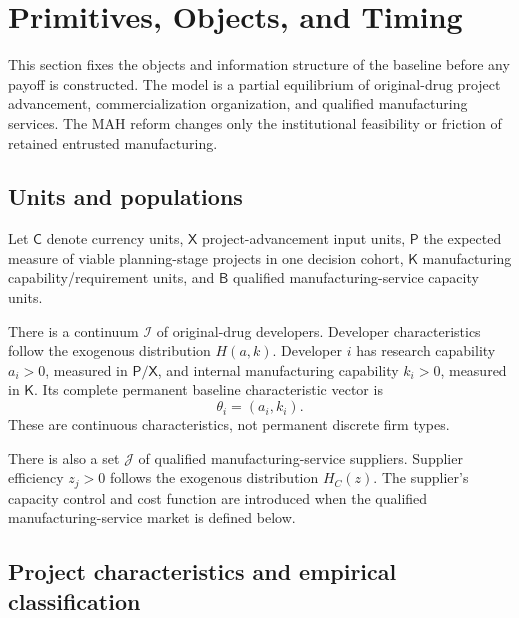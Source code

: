 \section{Primitives, Objects, and Timing}
\label{sec:p01-primitives-timing}

This section fixes the objects and information structure of the baseline before
any payoff is constructed.  The model is a partial equilibrium of
original-drug project advancement, commercialization organization, and
qualified manufacturing services.  The MAH reform changes only the
institutional feasibility or friction of retained entrusted manufacturing.

\subsection{Units and populations}
\label{subsec:p01-units-populations}

Let \(\mathsf C\) denote currency units, \(\mathsf X\) project-advancement
input units, \(\mathsf P\) the expected measure of viable planning-stage
projects in one decision cohort, \(\mathsf K\) manufacturing
capability/requirement units, and \(\mathsf B\) qualified manufacturing-service
capacity units.

There is a continuum \(\mathcal I\) of original-drug developers.  Developer
characteristics follow the exogenous distribution \(H(a,k)\).  Developer \(i\)
has research capability \(a_i>0\), measured in \(\mathsf P/\mathsf X\), and
internal manufacturing capability \(k_i>0\), measured in \(\mathsf K\).  Its
complete permanent baseline characteristic vector is
\begin{equation}
  \theta_i=(a_i,k_i).
  \label{eq:p01-developer-type}
\end{equation}
These are continuous characteristics, not permanent discrete firm types.

There is also a set \(\mathcal J\) of qualified manufacturing-service
suppliers.  Supplier efficiency \(z_j>0\) follows the exogenous distribution
\(H_C(z)\).  The supplier's capacity control and cost function are introduced
when the qualified manufacturing-service market is defined below.

\subsection{Project characteristics and empirical classification}
\label{subsec:p01-projects}


